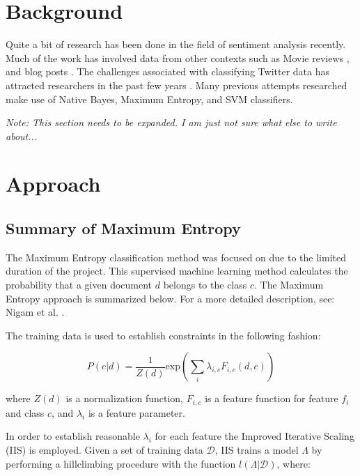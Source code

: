 \documentclass[12pt]{article}
\begin{document}
\section{Background}

Quite a bit of research has been done in the field of sentiment analysis
recently. Much of the work has involved data from other contexts such as Movie
reviews \cite{Pang2002}, and blog posts \cite{Melville2009}. The challenges
associated with classifying Twitter data has attracted researchers in the past
few years \cite{Jianfeng2013} \cite{Barbosa2010} \cite{Gokulakrishnan2012}.
Many previous attempts researched make use of Native Bayes, Maximum Entropy,
and SVM classifiers.

\textit{Note: This section needs to be expanded. I am just not sure what else to write about...}


\section{Approach}

\subsection{Summary of Maximum Entropy}

The Maximum Entropy classification method was focused on due to the limited
duration of the project. This supervised machine learning method calculates the
probability that a given document $d$ belongs to the class $c$.  The Maximum
Entropy approach is summarized below. For a more detailed description, see:
Nigam et al. \cite{Nigam1999}.

The training data is used to establish constraints in the following fashion:

\begin{equation}
    P(c | d) = \frac{1}{Z(d)} \mathrm{exp}(\sum\limits_{i} \lambda _{i,c} F_{i,c}(d,c) )
\end{equation}

where $Z(d)$ is a normalization function, $F_{i,c}$ is a feature function for
feature $f_{i}$ and class $c$, and $\lambda_{i}$ is a feature parameter.

In order to establish reasonable $\lambda_{i}$ for each feature the Improved
Iterative Scaling (IIS) is employed. Given a set of training data
$\mathcal{D}$, IIS trains a model $\Lambda$ by performing a hillclimbing
procedure with the function $l(\Lambda|\mathcal{D})$, where:
\end{document}
